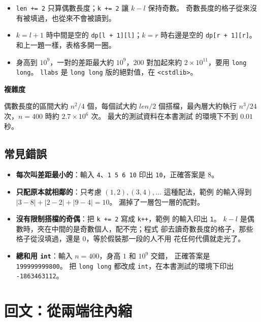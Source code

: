 
\begin{itemize}
\item \texttt{len += 2} 只算偶數長度；\texttt{k += 2} 讓 $k - l$ 保持奇數。
奇數長度的格子從來沒有被填過，也從來不會被讀到。
\item $k = l + 1$ 時中間是空的 \texttt{dp[l + 1][l]}；$k = r$ 時右邊是空的
\texttt{dp[r + 1][r]}。 和上一題一樣，表格多開一圈。
\item 身高到 $10^9$，一對的差距最大約 $10^9$，$200$ 對加起來約
$2 \times 10^{11}$，要用 \texttt{long long}。 \texttt{llabs} 是
\texttt{long long} 版的絕對值，在 \texttt{<cstdlib>}。
\end{itemize}

\textbf{複雜度}

偶數長度的區間大約 $n^2/4$ 個，每個試大約 $len/2$ 個搭檔，最內層大約執行
$n^3/24$ 次，$n = 400$ 時約 $2.7 \times 10^6$ 次。 最大的測試資料在本書測試
的環境下不到 $0.01$ 秒。

\subsection{常見錯誤}

\begin{itemize}
\item \textbf{每次叫差距最小的}：輸入 \texttt{4}、\texttt{1 5 6 10} 印出
\texttt{10}，正確答案是 $8$。
\item \textbf{只配原本就相鄰的}：只考慮 $(1, 2), (3, 4), \ldots$ 這種配法，範例
的輸入得到 $|3 - 8| + |2 - 2| + |9 - 4| = 10$。 漏掉了一層包一層的配對。
\item \textbf{沒有限制搭檔的奇偶}：把 \texttt{k += 2} 寫成 \texttt{k++}，範例
的輸入印出 \texttt{1}。 $k - l$ 是偶數時，夾在中間的是奇數個人，配不完；程式
卻去讀奇數長度的格子，那些格子從沒填過，還是 $0$，等於假裝那一段的人不用
花任何代價就走光了。
\item \textbf{總和用 \texttt{int}}：輸入 $n = 400$，身高 $1$ 和 $10^9$ 交錯，
正確答案是 \texttt{199999999800}。 把 \texttt{long long} 都改成
\texttt{int}，在本書測試的環境下印出 \texttt{-1863463112}。
\end{itemize}

\section{回文：從兩端往內縮}
\label{sec:ivdp-pal}

